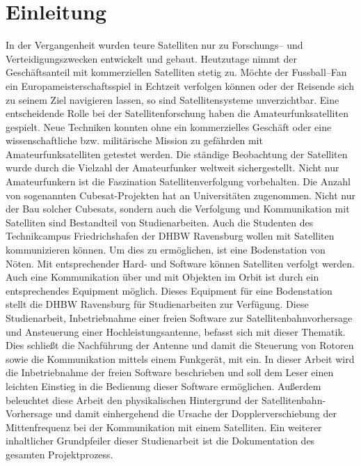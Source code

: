 
\chapter{Einleitung}
In der Vergangenheit wurden teure Satelliten nur zu Forschungs-- und Verteidigungszwecken entwickelt und gebaut. Heutzutage nimmt der Geschäftsanteil mit kommerziellen Satelliten stetig zu. Möchte der Fussball--Fan ein Europameisterschaftsspiel in Echtzeit verfolgen können oder der Reisende sich zu seinem Ziel navigieren lassen, so sind Satellitensysteme unverzichtbar.\newpar
Eine entscheidende Rolle bei der Satellitenforschung haben die Amateurfunksatelliten gespielt. Neue Techniken konnten ohne ein kommerzielles Geschäft oder eine wissenschaftliche bzw. militärische Mission zu gefährden mit Amateurfunksatelliten getestet werden. Die ständige Beobachtung der Satelliten wurde durch die Vielzahl der Amateurfunker weltweit sichergestellt. Nicht nur Amateurfunkern ist die Faszination Satellitenverfolgung vorbehalten. Die Anzahl von sogenannten Cubesat-Projekten hat an Universitäten zugenommen. Nicht nur der Bau solcher Cubesats, sondern auch die Verfolgung und Kommunikation mit Satelliten sind Bestandteil von Studienarbeiten.\newpar
Auch die Studenten des Technikcampus Friedrichshafen der DHBW Ravensburg wollen mit Satelliten kommunizieren können. Um dies zu ermöglichen, ist eine Bodenstation von Nöten. Mit entsprechender Hard- und Software können Satelliten verfolgt werden. Auch eine Kommunikation über und mit Objekten im Orbit ist durch ein entsprechendes Equipment möglich.\newpar
Dieses Equipment für eine Bodenstation stellt die DHBW Ravensburg für Studienarbeiten zur Verfügung. Diese Studienarbeit, Inbetriebnahme einer freien Software zur Satellitenbahnvorhersage und Ansteuerung einer Hochleistungsantenne, befasst sich mit dieser Thematik. Dies schließt die Nachführung der Antenne und damit die Steuerung von Rotoren sowie die Kommunikation mittels einem Funkgerät, mit ein. In dieser Arbeit wird die Inbetriebnahme der freien Software beschrieben und soll dem Leser einen leichten Einstieg in die Bedienung dieser Software ermöglichen. Außerdem beleuchtet diese Arbeit den physikalischen Hintergrund der Satellitenbahn-Vorhersage und damit einhergehend die Ursache der Dopplerverschiebung der Mittenfrequenz bei der Kommunikation mit einem Satelliten. Ein weiterer inhaltlicher Grundpfeiler dieser Studienarbeit ist die Dokumentation des gesamten Projektprozess.